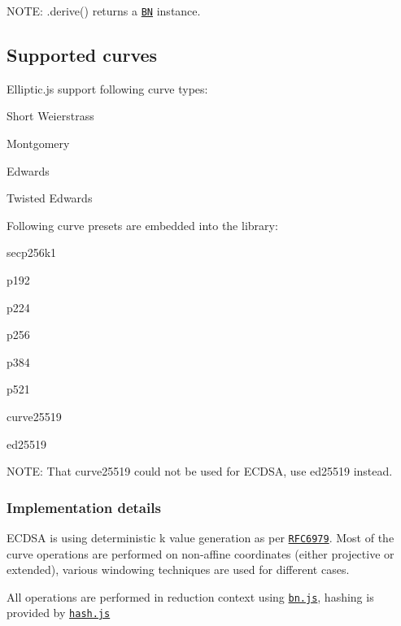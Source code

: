 N\+O\+TE\+: {\ttfamily .derive()} returns a \href{https://github.com/indutny/bn.js}{\tt BN} instance.

\subsection*{Supported curves}

Elliptic.\+js support following curve types\+:


\begin{DoxyItemize}
\item Short Weierstrass
\item Montgomery
\item Edwards
\item Twisted Edwards
\end{DoxyItemize}

Following curve \textquotesingle{}presets\textquotesingle{} are embedded into the library\+:


\begin{DoxyItemize}
\item {\ttfamily secp256k1}
\item {\ttfamily p192}
\item {\ttfamily p224}
\item {\ttfamily p256}
\item {\ttfamily p384}
\item {\ttfamily p521}
\item {\ttfamily curve25519}
\item {\ttfamily ed25519}
\end{DoxyItemize}

N\+O\+TE\+: That {\ttfamily curve25519} could not be used for E\+C\+D\+SA, use {\ttfamily ed25519} instead.

\subsubsection*{Implementation details}

E\+C\+D\+SA is using deterministic {\ttfamily k} value generation as per \href{http://tools.ietf.org/html/rfc6979}{\tt R\+F\+C6979}. Most of the curve operations are performed on non-\/affine coordinates (either projective or extended), various windowing techniques are used for different cases.

All operations are performed in reduction context using \href{https://github.com/indutny/bn.js}{\tt bn.\+js}, hashing is provided by \href{https://github.com/indutny/hash.js}{\tt hash.\+js}


